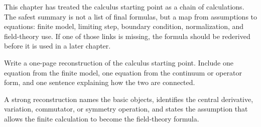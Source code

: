 This chapter has treated the calculus starting point as a chain of calculations.  The safest summary is not a list of final formulas, but a map from assumptions to equations: finite model, limiting step, boundary condition, normalization, and field-theory use.  If one of those links is missing, the formula should be rederived before it is used in a later chapter.

\begin{exercise}
Write a one-page reconstruction of the calculus starting point.  Include one equation from the finite model, one equation from the continuum or operator form, and one sentence explaining how the two are connected.
\begin{answer}
A strong reconstruction names the basic objects, identifies the central derivative, variation, commutator, or symmetry operation, and states the assumption that allows the finite calculation to become the field-theory formula.
\end{answer}
\end{exercise}
